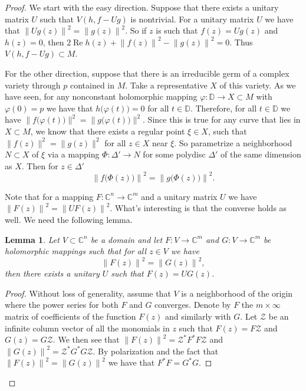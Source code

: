 \documentclass[12pt,openany]{book}
\renewcommand{\Re}{\operatorname{Re}}
\newcommand{\snorm}[1]{\lVert {#1} \rVert}
\newcommand{\norm}[1]{\left\lVert {#1} \right\rVert}
\newcommand{\C}{{\mathbb{C}}}
\newcommand{\bD}{{\mathbb{D}}}
\newcommand{\sZ}{{\mathcal{Z}}}
\theoremstyle{plain}
\newtheorem{lemma}[thm]{Lemma}
\theoremstyle{remark}
\theoremstyle{definition}
\theoremstyle{exercise}
\theoremstyle{example}
\begin{document}
\begin{proof}
We start with the easy direction.  Suppose that there
exists a unitary matrix $U$ such that $V(h,f-Ug)$ is
nontrivial.  For a unitary matrix $U$
we have that $\norm{Ug(z)}^2 = \norm{g(z)}^2$.  So if $z$
is such that $f(z) = Ug(z)$ and $h(z) = 0$, then
$2 \Re h(z) + \norm{f(z)}^2-\norm{g(z)}^2 = 0$.  Thus $V(h,f-Ug) \subset M$.

For the other direction, suppose that there is an irreducible germ of
a complex variety through $p$ contained in $M$.  Take a representative
$X$ of this variety.
As we have seen, for
any 
nonconstant holomorphic mapping
$\varphi \colon \bD \to X \subset M$
with $\varphi(0) = p$
we have that
$h\bigl(\varphi(t)\bigr) = 0$ for all $t \in \bD$.  Therefore,
for all $t \in \bD$ we have
$\snorm{f\bigl(\varphi(t)\bigr)}^2 = \snorm{g\bigl(\varphi(t)\bigr)}^2$.
Since this is true for any curve that lies in $X \subset M$, we know that
there exists a regular point $\xi \in X$, such that 
$\snorm{f(z)}^2 = \snorm{g(z)}^2$ for all $z \in X$ near $\xi$.
So parametrize a neighborhood $N \subset X$ of $\xi$ via a
mapping $\Phi \colon \Delta' \to N$ for some polydisc $\Delta'$ of
the same dimension as $X$.  Then for $z \in \Delta'$
\begin{equation}
\norm{f\bigl(\Phi(z)\bigr)}^2 = \norm{g\bigl(\Phi(z)\bigr)}^2 .
\end{equation}

Note that for a mapping $F \colon \C^n \to \C^m$ and
a unitary matrix $U$ we have
$\norm{F(z)}^2 = \norm{U F(z)}^2$.  What's interesting is that
the converse holds as well.  We need the following lemma.

\begin{lemma}
Let $V \subset \C^n$ be a domain and
let $F \colon V \to \C^m$ and
$G \colon V \to \C^m$ be holomorphic mappings such that
for all $z \in V$ we have
\begin{equation}
\norm{F(z)}^2 = \norm{G(z)}^2 ,
\end{equation}
then there exists a unitary $U$ such that $F(z) = U G (z)$.
\end{lemma}

\begin{proof}
Without loss of generality, assume that $V$ is a neighborhood
of the origin where the power series for both $F$ and $G$ converges.
Denote by $F$ the $m \times \infty$ matrix of coefficients
of the function $F(z)$ and similarly with $G$.  
Let $\sZ$ be an infinite column vector of all the monomials in $z$
such that $F(z) = F \sZ$ and
$G(z) = G \sZ$.  We then see that
$\norm{F(z)}^2 = \sZ^* F^* F \sZ$
and
$\norm{G(z)}^2 = \sZ^* G^* G \sZ$.  By polarization and the fact that
$\norm{F(z)}^2 = \norm{G(z)}^2$ we have that
$F^*F = G^*G$.


\end{proof}
\end{proof}
\end{document}
